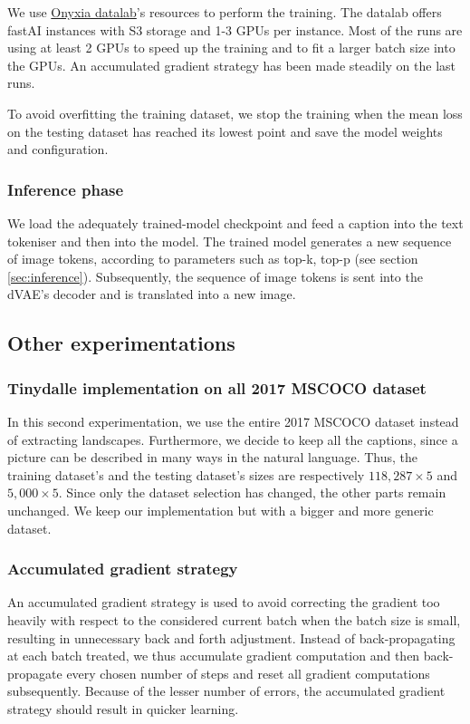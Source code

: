 \documentclass{article}
\begin{document}
\begin{multicols}{2}
We use \href{https://datalab.sspcloud.fr/}{Onyxia datalab}'s resources to perform the training. The datalab offers fastAI instances with S3 storage and 1-3 GPUs per instance. Most of the runs are using at least 2 GPUs to speed up the training and to fit a larger batch size into the GPUs. An accumulated gradient strategy has been made steadily on the last runs.

To avoid overfitting the training dataset, we stop the training when the mean loss on the testing dataset has reached its lowest point and save the model weights and configuration.

\subsubsection{Inference phase}

We load the adequately trained-model checkpoint and feed a caption into the text tokeniser and then into the model. The trained model generates a new sequence of image tokens, according to parameters such as top-k, top-p (see section \ref{sec:inference}). Subsequently, the sequence of image tokens is sent into the dVAE's decoder and is translated into a new image.

\subsection{Other experimentations}

\subsubsection{Tinydalle implementation on all 2017 MSCOCO dataset}

In this second experimentation, we use the entire 2017 MSCOCO dataset instead of extracting landscapes. Furthermore, we decide to keep all the captions, since a picture can be described in many ways in the natural language. Thus, the training dataset's and the testing dataset's sizes are respectively $118,287\times 5$ and $5,000 \times 5$.
Since only the dataset selection has changed, the other parts remain unchanged. We keep our implementation but with a bigger and more generic dataset.

\subsubsection{Accumulated gradient strategy}

An accumulated gradient strategy is used to avoid correcting the gradient too heavily with respect to the considered current batch when the batch size is small, resulting in unnecessary back and forth adjustment. Instead of back-propagating at each batch treated, we thus accumulate gradient computation and then back-propagate every chosen number of steps and reset all gradient computations subsequently. Because of the lesser number of errors, the accumulated gradient strategy should result in quicker learning.


\end{multicols}
\end{document}

